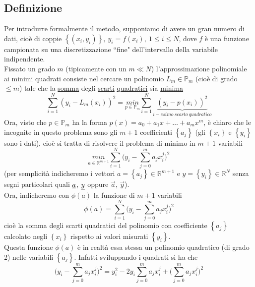 \documentclass[12pt,a4paper]{article}
\begin{document}
\subsection{Definizione}
Per introdurre formalmente il metodo, supponiamo di avere un gran numero di dati, cioè di coppie $\left\{ (x_i,y_i) \right\}, \ y_i = f(x_i), \ 1 \leq i \leq N$,
dove $f$ è una funzione campionata su una discretizzazione ``fine" dell'intervallo della variabile indipendente. \\
Fissato un grado $m$ (tipicamente con un $m \ll N$) l'approssimazione polinomiale ai minimi quadrati consiste nel cercare un polinomio $L_m \in \mathbb{P}_m$ (cioè di grado $\leq m$) tale che la \uline{somma} degli \uline{scarti} \uline{quadratici} sia \uline{minima}
\begin{equation*}
    \sum_{i=1}^N (y_i - L_m(x_i))^2 = \underset{p \in \mathbb{P}_m}{min} \sum_{i=1}^N \underbrace{(y_i - p(x_i))^2}_{i-esimo \ scarto \ quadratico}
\end{equation*}
Ora, visto che $p \in \mathbb{P}_m$ ha la forma
$p(x) = a_0 + a_1x + \dots + a_mx^m$, è chiaro che le incognite in questo problema sono gli $m+1$ coefficienti $\left\{ a_j \right\}$ (gli $\left\{ x_i \right\}$ e $\left\{ y_i \right\}$ sono i dati), cioè si tratta di risolvere il problema di minimo in $m+1$ variabili
\begin{equation*}
    \underset{a \in \mathbb{R}^{m+1}}{min}\sum_{i=1}^N \biggl( y_i - \sum_{j=0}^m a_j x_i^j \biggr) ^2
\end{equation*}
(per semplicità indicheremo i vettori $a = \left\{ a_j \right\} \in \mathbb{R}^{m+1}$ e $y = \left\{ y_i \right\} \in \mathbb{R}^{N}$ senza segni particolari quali $\uline{a}$, $\uline{y}$ oppure $\Vec{a}$, $\Vec{y}$). \\
Ora, indicheremo con $\phi(a)$ la funzione di $m+1$ variabili 
\begin{equation*}
    \phi(a) = \sum_{i=1}^N \biggl( y_i - \sum_{j=0}^m a_j x_i^j \biggr) ^2
\end{equation*}
cioè la somma degli scarti quadratici del polinomio con coefficiente $\left\{ a_j \right\}$ calcolato negli $\left\{ x_i \right\}$ rispetto ai valori misurati $\left\{ y_i \right\}$. \\
Questa funzione $\phi(a)$ è in realtà essa stessa un polinomio quadratico (di grado 2) nelle variabili $\left\{ a_j \right\}$. Infatti sviluppando i quadrati si ha che
\begin{equation*}
    \biggl( y_i - \sum_{j=0}^m a_j x_i^j \biggr)^2 = y_i^2 - 2y_i\sum_{j=0}^m a_j x_i^j + \biggl( \sum_{j=0}^m a_j x_i^j \biggr)^2
\end{equation*}
\end{document}
